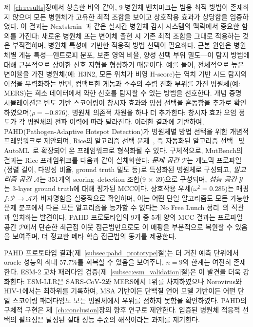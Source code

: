 제~\ref{ch:results}장에서 상술한 바와 같이, 9-병원체 벤치마크는 범용 최적 방법이 존재하지 않으며 모든 병원체가 고유한 최적 조합을 보이고 상호작용 효과가 상당함을 입증하였다. 이 결과는 Nextstrain~\cite{nextstrain2018hadfield}과 같은 실시간 병원체 감시 시스템의 맥락에서 중요한 함의를 가진다: 새로운 병원체 또는 변이체 출현 시 기존 최적 조합을 그대로 적용하는 것은 부적절하며, 병원체 특성에 기반한 적응적 방법 선택이 필요하다.
근본 원인은 병원체별 게놈 특성---엔트로피 분포, 보존 영역 비율, 양성 선택 부위 밀도---이 탐지 방법에 대해 근본적으로 상이한 신호 지형을 형성하기 때문이다.
예를 들어, 전체적으로 높은 변이율을 가진 병원체(예: H3N2, 모든 위치가 비영 H-score)는 역치 기반 시드 탐지의 이점을 무력화하는 반면, 컴팩트한 게놈과 소수의 수렴 진화 부위를 가진 병원체(예: MERS)는 희소 데이터에서 약한 신호를 탐지할 수 있는 방법을 선호한다.
개념 증명 시뮬레이션은 빈도 기반 스코어링이 창시자 효과와 양성 선택을 혼동함을 추가로 확인하였으며($\rho = -0.876$), 병원체 의존적 차원을 하나 더 추가한다: 창시자 효과 오염 정도가 각 병원체의 전파 이력에 따라 달라진다.
이러한 결과에 기반하여, PAHD(Pathogen-Adaptive Hotspot Detection)가 병원체별 방법 선택을 위한 개념적 프레임워크로 제안되며, Rice의 알고리즘 선택 문제~\cite{rice1976algorithm}, 즉 자동화된 알고리즘 선택~\cite{kerschke2019algorithm} 및 AutoML~\cite{kotthoff2016algorithm}로 확장되어 온 프레임워크로 형식화될 수 있다.
구체적으로, MutBench의 결과는 Rice 프레임워크를 다음과 같이 실체화한다: \textit{문제 공간} $\mathcal{P}$는 게노믹 프로파일(정렬 길이, 다양성 비율, ground truth 밀도 등)로 특성화된 병원체로 구성되고, \textit{알고리즘 공간} $\mathcal{A}$는 351개의 scoring--detection 조합(9 $\times$ 39)으로 구성되며, \textit{성능 공간} $\mathcal{Y}$는 3-layer ground truth에 대해 평가된 MCC이다. 상호작용 우세($\omega^2 = 0.285$)는 매핑 $f: \mathcal{P} \to \mathcal{A}$가 비자명함을 실증적으로 확인하며, 이는 어떤 단일 알고리즘도 모든 가능한 문제 분포에서 다른 모든 알고리즘을 능가할 수 없다는 No Free Lunch 정리~\cite{wolpert1997nfl}의 직관과 일치하는 발견이다. PAHD 프로토타입의 9개 중 5개 양의 MCC 결과는 프로파일 공간 $\mathcal{P}$에서 단순한 최근접 이웃 접근법만으로도 이 매핑을 부분적으로 복원할 수 있음을 보여주며, 더 정교한 메타 학습 접근법의 동기를 제공한다.

PAHD 프로토타입 결과(제~\ref{subsec:pahd_prototype}절)는 더 거친 예측 단위에서 oracle 성능의 최대 57.7\%를 회복할 수 있음을 보여주나, $n = 9$의 한계는 여전히 존재한다.
ESM-2 교차 패러다임 검증(제~\ref{subsec:esm_validation}절)은 이 발견을 더욱 강화한다: ESM-LLR은 SARS-CoV-2와 MERS에서 1위를 차지하였으나 Norovirus와 HIV-1에서는 최하위를 기록하여, MSA 기반이든 단백질 언어 모델 기반이든 어떤 단일 스코어링 패러다임도 모든 병원체에서 우위를 점하지 못함을 확인하였다.
PAHD의 구체적 구현은 제~\ref{ch:conclusion}장의 향후 연구로 제안한다.
입증된 병원체 적응적 선택의 필요성은 달성된 절대 성능 수준의 해석이라는 과제를 제기한다.

